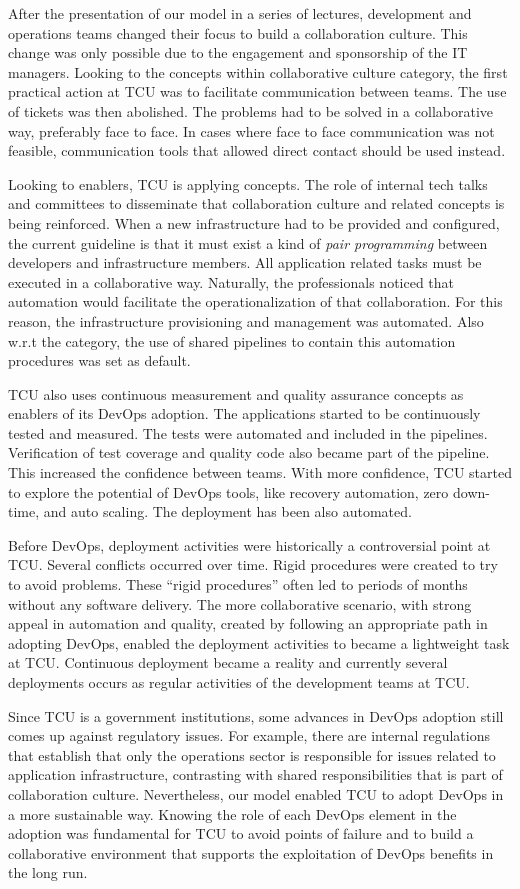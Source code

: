 After the presentation of our  model in a series of lectures, development and
operations teams changed their focus to build a collaboration culture. This
change was only possible due to the engagement and sponsorship of the IT
managers. Looking to the concepts within collaborative culture category, the first practical
action at TCU was to facilitate communication between teams. The use of tickets
was then abolished. The problems had to be solved in a collaborative way, preferably
face to face. In cases where face to face communication was not feasible, 
communication tools that allowed direct contact should be used instead.

Looking to enablers, TCU is applying  concepts. 
The role of internal tech talks and committees to disseminate that collaboration 
culture and related concepts is being reinforced.
When a new infrastructure had to be provided and configured, the current guideline is
that it must exist a kind of \emph{pair programming} between developers and infrastructure
members. All application related tasks must be executed in a collaborative
way. Naturally, the professionals noticed that automation would facilitate the
operationalization of that collaboration. For this reason, the infrastructure provisioning
and management was automated. Also w.r.t  the  category, 
the use of shared pipelines to contain this automation procedures was set as default.

TCU also uses continuous measurement and quality assurance concepts as
enablers of its DevOps adoption. The applications started to be continuously
tested and measured. The tests were automated and included in the pipelines.
Verification of test coverage and quality code also became part of the pipeline.
This increased the confidence between teams. With more confidence, TCU started
to explore the potential of DevOps tools, like recovery automation, zero
down-time, and auto scaling. The deployment has been also automated.

Before DevOps, deployment activities were historically a controversial point at TCU.
Several conflicts occurred over time. Rigid procedures were created to try to
avoid problems. These ``rigid procedures'' often led to periods of months
without any software delivery. The more collaborative scenario, with strong appeal in automation and quality, 
created by following an appropriate path in adopting DevOps, enabled the deployment activities to became 
a lightweight task at TCU. Continuous deployment became a reality and currently several deployments 
occurs as regular activities of the development teams at TCU.

Since TCU is a government institutions, some advances in DevOps adoption still comes up
against regulatory issues. For example, there are internal regulations that
establish that only the operations sector is responsible for issues related to
application infrastructure, contrasting with shared responsibilities that is
part of collaboration culture. Nevertheless, our model enabled TCU to adopt DevOps in a more 
sustainable way. Knowing the role
of each DevOps element in the adoption was fundamental for TCU to avoid points
of failure and to build a collaborative environment that supports the
exploitation of DevOps benefits in the long run.
